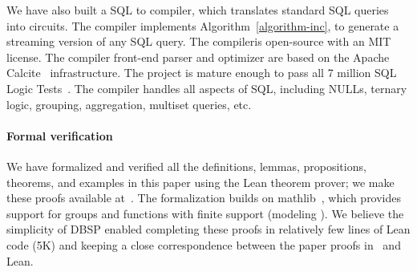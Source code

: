 We have also built a SQL to \dbsp compiler, which translates standard SQL queries
into \dbsp circuits.  The compiler implements Algorithm~\ref{algorithm-inc}, to
generate a streaming version of any SQL query.
The compileris  open-source  
with an MIT license.  The compiler front-end parser and optimizer 
are based on the Apache Calcite~\cite{begoli-icmd18} infrastructure.  The
project is mature enough to pass all 7 million SQL Logic Tests~\cite{sqllogictest}.  The compiler handles
all aspects of SQL, including NULLs, ternary logic, grouping, aggregation, multiset queries, etc.

\paragraph{Formal verification}

We have formalized and verified all the definitions, lemmas, 
propositions, theorems, and examples in this paper using the Lean theorem prover; we make
these proofs available at~.
The formalization builds on mathlib~\cite{mathlib2020}, which provides support
for groups and functions with finite support (modeling \zrs). We believe
the simplicity of DBSP enabled completing these proofs in relatively few lines
of Lean code (5K) and keeping a close correspondence between the
paper proofs in~\cite{tr} and Lean.